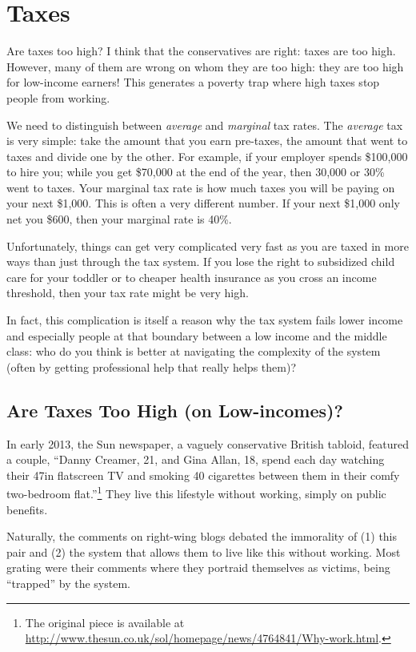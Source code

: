 \chapter{Taxes}%
\label{chpt:taxes}

Are taxes too high? I think that the conservatives are right: taxes are too
high. However, many of them are wrong on whom they are too high: they are
too high for low-income earners! This generates a poverty trap where high taxes
stop people from working.

We need to distinguish between \emph{average} and \emph{marginal} tax rates.
The \emph{average} tax is very simple: take the amount that you earn pre-taxes,
the amount that went to taxes and divide one by the other. For example, if your
employer spends \$100,000 to hire you; while you get \$70,000 at the end of the
year, then 30,000 or 30\% went to taxes. Your marginal tax rate is how much
taxes you will be paying on your next \$1,000. This is often a very different
number. If your next \$1,000 only net you \$600, then your marginal rate is
40\%. %

Unfortunately, things can get very complicated very fast as you are taxed in
more ways than just through the tax system. If you lose the right to subsidized
child care for your toddler or to cheaper health insurance as you cross an
income threshold, then your tax rate might be very high.

In fact, this complication is itself a reason why the tax system fails lower
income and especially people at that boundary between a low income and the
middle class: who do you think is better at navigating the complexity of the
system (often by getting professional help that really helps them)?

\section{Are Taxes Too High (on Low-incomes)?}

In early 2013, the Sun newspaper, a vaguely conservative British tabloid,
featured a couple, ``Danny Creamer, 21, and Gina Allan, 18, spend each day
watching their 47in flatscreen TV and smoking 40 cigarettes between them in
their comfy two-bedroom flat.''\footnote{The original piece is available at
\url{http://www.thesun.co.uk/sol/homepage/news/4764841/Why-work.html}.} They
live this lifestyle without working, simply on public benefits.

Naturally, the comments on right-wing blogs debated the immorality of (1) this
pair and (2) the system that allows them to live like this without working.
Most grating were their comments where they portraid themselves as victims,
being ``trapped'' by the system.

